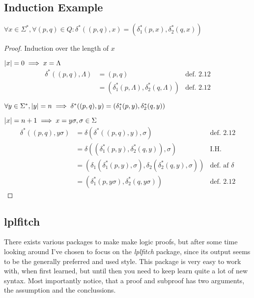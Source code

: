 \documentclass[a4, english]{article}
\begin{document}
\subsection{Induction Example}
\begin{lemma}[Martin 2.11]
	$\forall x \in \Sigma^* , \forall (p,q) \in Q: \delta^* ((p,q),x) = (\delta_1^* (p,x) , \delta_2^* (q,x))$
\end{lemma}
\begin{proof}
	\vspace{0.6em} \noindent
	Induction over the length of $x$

		$\left\lvert x \right\rvert = 0 \implies x = \Lambda$
		\begin{align*}
			\delta^*((p,q), \Lambda) &= (p,q)
							&\text{def. 2.12}
		\\
						 &= (\delta_1^* (p,\Lambda) , \delta_2^* (q,\Lambda))
						 	&\text{def. 2.12}
		\end{align*}

		$
			\forall y \in \Sigma^*, \left\lvert y \right\rvert = n
				\implies \delta^*((p,q), y) = (\delta_1^*(p,y), \delta_2^*(q,y))
		$
	
		$\left\lvert x \right\rvert = n+1 \implies x = y\sigma, \sigma \in \Sigma$
		\begin{align*}
			\delta^*((p,q),y\sigma) &= \delta(\delta^*((p,q),y),\sigma)
										&\text{def. 2.12}
		\\
							 		&= \delta((\delta_1^*(p,y), \delta_2^*(q,y)),\sigma)
							 			&\text{I.H.}
		\\
							 		&= (\delta_1(\delta_1^*(p,y),\sigma), \delta_2(\delta_2^*(q,y),\sigma))
							 			&\text{def. af } \delta
		\\
							 		&= (\delta_1^*(p,y\sigma), \delta_2^*(q,y\sigma))
							 			&\text{def. 2.12}
		\end{align*}
\end{proof}

\newpage
\subsection{lplfitch}
There exists various packages to make make logic proofs, but after some time looking around I've chosen to focus on the \emph{lplfitch} package, since its output seems to be the generally preferred and used style.
This package is very easy to work with, when first learned, but until then you need to keep learn quite a lot of new syntax. Most importantly notice, that a proof and subproof has two arguments, the assumption and the conclussions.
\begin{center}
\end{center}
\end{document}
